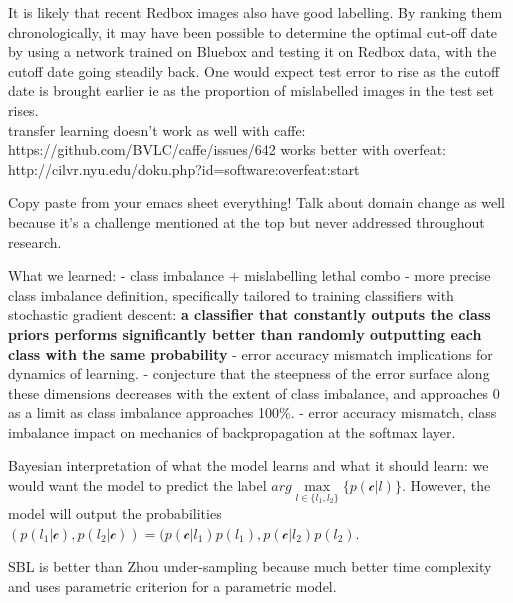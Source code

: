 \documentclass[a4paper,11pt]{article}
\begin{document}
It is likely that recent Redbox images also have good labelling. By ranking them chronologically, it may have been possible to determine the optimal cut-off date by using a network trained on Bluebox and testing it on Redbox data, with the cutoff date going steadily back. One would expect test error to rise as the cutoff date is brought earlier ie as the proportion of mislabelled images in the test set rises. \\

transfer learning doesn't work as well with caffe:
https://github.com/BVLC/caffe/issues/642
works better with overfeat: http://cilvr.nyu.edu/doku.php?id=software:overfeat:start

Copy paste from your emacs sheet everything! Talk about domain change as well because it's a challenge mentioned at the top but never addressed throughout research.

What we learned:
- class imbalance + mislabelling lethal combo
- more precise class imbalance definition, specifically tailored to training classifiers with stochastic gradient descent: \textbf{a classifier that constantly outputs the class priors performs significantly better than randomly outputting each class with the same probability}
- error accuracy mismatch implications for dynamics of learning.
- conjecture that the steepness of the error surface along these dimensions decreases with the extent of class imbalance, and approaches 0 as a limit as class imbalance approaches 100\%.
- error accuracy mismatch, class imbalance impact on mechanics of backpropagation at the softmax layer.

Bayesian interpretation of what the model learns and what it should learn: we would want the model to predict the label $arg\max\limits_{l \in \{l_1,l_2\}} \{p(\mathcal{c} | l)\}$. However, the model will output the probabilities $(p(l_1 | \mathcal{c}), p(l_2 | \mathcal{c})) = (p(\mathcal{c} | l_1) p(l_1), p(\mathcal{c} | l_2) p(l_2)$.

SBL is better than Zhou under-sampling because much better time complexity and uses parametric criterion for a parametric model.
\end{document}
